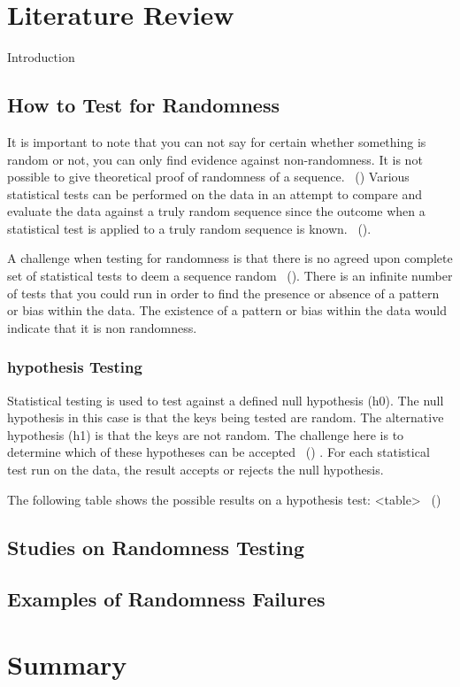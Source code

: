 \section{Literature Review}

Introduction

\subsection{How to Test for Randomness}

It is important to note that you can not say for certain whether something is random or not, you can only find evidence against non-randomness. It is not possible to give theoretical proof of randomness of a sequence. ~(\cite{55555}) Various statistical tests can be performed on the data in an attempt to compare and evaluate the data against a truly random sequence since the outcome when a statistical test is applied to a truly random sequence is known. ~(\cite{1195701}). \newline

A challenge when testing for randomness is that there is no agreed upon complete set of statistical tests to deem a sequence random ~(\cite{1195701}). There is an infinite number of tests that you could run in order to find the presence or absence of a pattern or bias within the data. The existence of a pattern or bias within the data would indicate that it is non randomness. \newline


\subsubsection{hypothesis Testing}

Statistical testing is used to test against a defined null hypothesis (h0). The null hypothesis in this case is that the keys being tested are random. The alternative hypothesis (h1) is that the keys are not random. The challenge here is to determine which of these hypotheses can be accepted ~(\cite{10.1145/3447773}) . For each statistical test run on the data, the result accepts or rejects the null hypothesis. \newline

The following table shows the possible results on a hypothesis test:
 <table> ~(\cite{1195701}) \newline




\subsection{Studies on Randomness Testing}

\subsection{Examples of Randomness Failures}

\section{Summary}